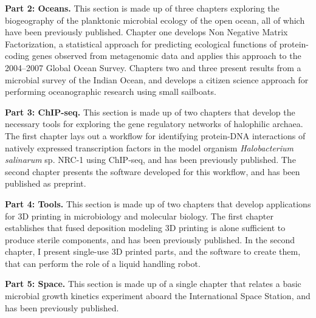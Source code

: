 \noindent\textbf{Part 2: Oceans.}
This section is made up of three chapters exploring the biogeography of the planktonic microbial ecology of the open ocean, all of which have been previously published. Chapter one develops Non Negative Matrix Factorization, a statistical approach for predicting ecological functions of protein-coding genes observed from metagenomic data and applies this approach to the 2004--2007 Global Ocean Survey. \cite{jiang2012functional} Chapters two and three present results from a microbial survey of the Indian Ocean, and develops a citizen science approach for performing oceanographic research using small sailboats. \cite{jeffries2015spatially, lauro2014common}

\noindent\textbf{Part 3: ChIP-seq.}
This section is made up of two chapters that develop the necessary tools for exploring the gene regulatory networks of halophilic archaea. The first chapter lays out a workflow for identifying protein-DNA interactions of natively expressed transcription factors in the model organism {\em Halobacterium salinarum} sp. NRC-1 using ChIP-seq, and has been previously published. \cite{wilbanks2012workflow} The second chapter presents the software developed for this workflow, and has been published as preprint. \cite{neches2014fit}

\noindent\textbf{Part 4: Tools.}
This section is made up of two chapters that develop applications for 3D printing in microbiology and molecular biology. The first chapter establishes that fused deposition modeling 3D printing is alone sufficient to produce sterile components, and has been previously published. \cite{neches2016intrinsic} In the second chapter, I present single-use 3D printed parts, and the software to create them, that can perform the role of a liquid handling robot.

\noindent\textbf{Part 5: Space.}
This section is made up of a single chapter that relates a basic microbial growth kinetics experiment aboard the International Space Station, and has been previously published. \cite{coil2016growth}

\printbibliography[heading=subbibliography]